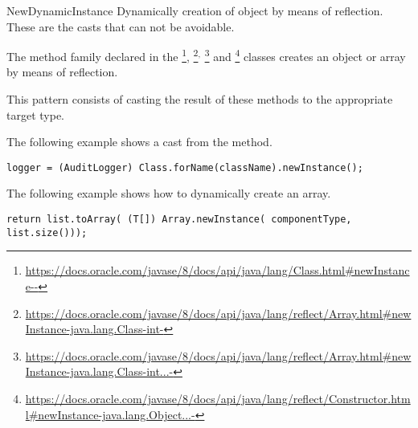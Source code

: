 \begin{pattern}{NewDynamicInstance}
Dynamically creation of object by means of reflection.
These are the casts that can not be avoidable.

The  method family declared in the
\footnote{\url{https://docs.oracle.com/javase/8/docs/api/java/lang/Class.html\#newInstance--}},
\footnote{\url{https://docs.oracle.com/javase/8/docs/api/java/lang/reflect/Array.html\#newInstance-java.lang.Class-int-}}\(^{,}\)
\footnote{\url{https://docs.oracle.com/javase/8/docs/api/java/lang/reflect/Array.html\#newInstance-java.lang.Class-int...-}} and
\footnote{\url{https://docs.oracle.com/javase/8/docs/api/java/lang/reflect/Constructor.html\#newInstance-java.lang.Object...-}}
classes creates an object or array by means of reflection.

This pattern consists of casting the result of these methods to the appropriate target type.

\instances{}


The following example shows a cast from the 
method.

\begin{lstlisting}[style=java,caption={The \pname{} pattern using the \texttt{Class} class.}]
logger = (AuditLogger) Class.forName(className).newInstance();
\end{lstlisting}

The following example shows how to dynamically create an array.

\begin{lstlisting}[style=java,caption={Example of the \pname{} pattern using the \texttt{Array} class.}]
return list.toArray( (T[]) Array.newInstance( componentType, list.size()));
\end{lstlisting}



\end{pattern}
